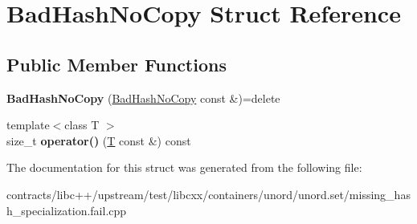 \hypertarget{struct_bad_hash_no_copy}{}\section{Bad\+Hash\+No\+Copy Struct Reference}
\label{struct_bad_hash_no_copy}
\subsection*{Public Member Functions}
\begin{DoxyCompactItemize}
\item 
\mbox{\label{struct_bad_hash_no_copy_a78af56e63423bdc4f4c79e4744e28f9b}} 
{\bfseries Bad\+Hash\+No\+Copy} (\mbox{\hyperlink{struct_bad_hash_no_copy}{Bad\+Hash\+No\+Copy}} const \&)=delete
\item 
\mbox{\label{struct_bad_hash_no_copy_ab7593045140a4f38b10e9cdd72fe023b}} 
{\footnotesize template$<$class T $>$ }\\size\+\_\+t {\bfseries operator()} (\mbox{\hyperlink{struct_t}{T}} const \&) const
\end{DoxyCompactItemize}


The documentation for this struct was generated from the following file\+:\begin{DoxyCompactItemize}
\item 
contracts/libc++/upstream/test/libcxx/containers/unord/unord.\+set/missing\+\_\+hash\+\_\+specialization.\+fail.\+cpp\end{DoxyCompactItemize}
